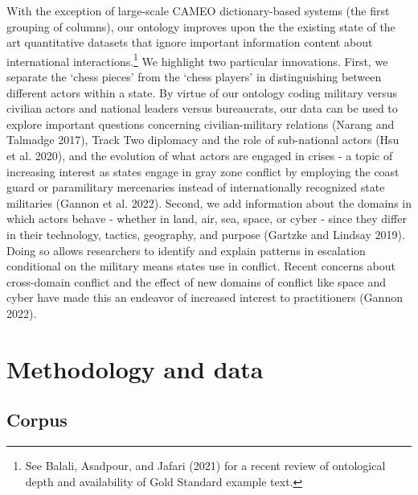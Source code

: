 \documentclass{article}
\begin{document}
With the exception of large-scale CAMEO dictionary-based systems (the
first grouping of columns), our ontology improves upon the the existing
state of the art quantitative datasets that ignore important information
content about international interactions.\footnote{See Balali, Asadpour,
  and Jafari (2021) for a recent review of ontological depth and
  availability of Gold Standard example text.} We highlight two
particular innovations. First, we separate the `chess pieces' from the
`chess players' in distinguishing between different actors within a
state. By virtue of our ontology coding military versus civilian actors
and national leaders versus bureaucrats, our data can be used to explore
important questions concerning civilian-military relations (Narang and
Talmadge 2017), Track Two diplomacy and the role of sub-national actors
(Hsu et al. 2020), and the evolution of what actors are engaged in
crises - a topic of increasing interest as states engage in gray zone
conflict by employing the coast guard or paramilitary mercenaries
instead of internationally recognized state militaries (Gannon et al.
2022). Second, we add information about the domains in which actors
behave - whether in land, air, sea, space, or cyber - since they differ
in their technology, tactics, geography, and purpose (Gartzke and
Lindsay 2019). Doing so allows researchers to identify and explain
patterns in escalation conditional on the military means states use in
conflict. Recent concerns about cross-domain conflict and the effect of
new domains of conflict like space and cyber have made this an endeavor
of increased interest to practitioners (Gannon 2022).

\hypertarget{methodology-and-data}{%
\section{Methodology and data}\label{methodology-and-data}}

\hypertarget{corpus}{%
\subsection{Corpus}\label{corpus}}
\end{document}
